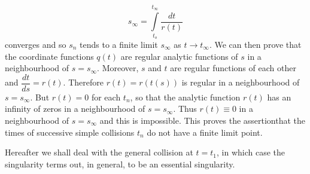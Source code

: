 $$
s_\infty = \int\limits^{t_\infty}_{t_o} \frac{dt}{r(t)}
$$
converges and so $s_n$ tends to a finite limit $s_\infty$ as $t \to t_\infty$. We can then prove that the coordinate functions $q(t)$ are regular analytic functions of $s$ in a neighbourhood of $s = s_\infty$. Moreover, $s$ and $t$ are regular functions of each other and $\dfrac{dt}{ds} = r(t)$. Therefore $r(t) = r(t(s))$ is regular in a neighbourhood of $s=s_\infty$. But $r(t) = 0$ for each $t_n$, so that the analytic function $r(t)$ has an infinity of zeros in a neighbourhood of $s = s_\infty$. Thus $r(t) \equiv 0$ in a neighbourhood of $s = s_\infty$ and this is impossible. This proves the assertion\pageoriginale that the times of successive simple collisions $t_n$ do not have a finite limit point.

Hereafter we shall deal with the general collision at $t = t_1$, in which case the singularity terms out, in general, to be an essential singularity. 
 
